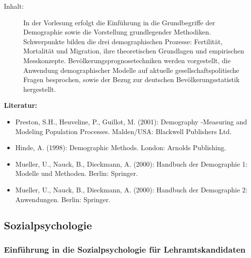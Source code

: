 \documentclass[%
a4paper, %
11pt,               %
leqno,              %
fleqn,              %
]
{scrartcl}
\begin{document}
\begin{description}
  \item[Inhalt:] In der Vorlesung erfolgt die Einführung in die Grundbegriffe
    der Demographie sowie die Vorstellung grundlegender Methodiken. Schwerpunkte
    bilden die drei demographischen Prozesse: Fertilität, Mortalität und
    Migration, ihre theoretischen Grundlagen und empirischen Messkonzepte.
    Bevölkerungsprognosetechniken werden vorgestellt, die Anwendung
    demographischer Modelle auf aktuelle gesellschaftspolitische Fragen
    besprochen, sowie der Bezug zur deutschen Bevölkerungsstatistik hergestellt.
\end{description}
\textsf{\textbf{Literatur:}}
\begin{itemize}\itemsep0pt
  \item Preston, S.H., Heuveline, P., Guillot, M. (2001): Demography -Measuring
    and Modeling Population Processes. Malden/USA: Blackwell Publishers Ltd.
  \item Hinde, A. (1998): Demographic Methods. London: Arnolds Publishing.
  \item Mueller, U., Nauck, B., Dieckmann, A. (2000): Handbuch der Demographie
    1: Modelle und Methoden. Berlin: Springer.
  \item Mueller, U., Nauck, B., Dieckmann, A. (2000): Handbuch der Demographie
    2: Anwendungen. Berlin: Springer.
\end{itemize}



\subsection{Sozialpsychologie} %
\label{sub:Sozialpsychologie}

\subsubsection{Einführung in die Sozialpsychologie für Lehramtskandidaten}
\label{ssub:Einführung in die Sozialpsychologie für Lehramtskandidaten}
\end{document}
